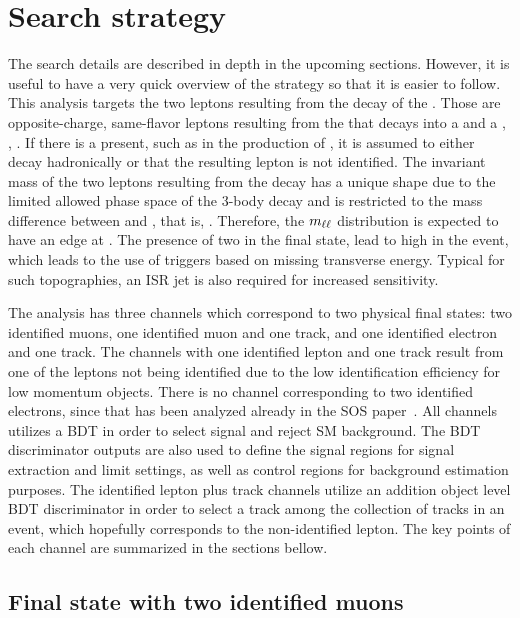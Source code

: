 \clearpage
\section{Search strategy}
\label{sec:search-strategy}

The search details are described in depth in the upcoming sections. However, it is useful to have a very quick overview of the strategy so that it is easier to follow. This analysis targets the two leptons resulting from the decay of the \neutt. Those are opposite-charge, same-flavor leptons \ellell resulting from the \neutt that decays into a \neuto and a \PZstar, \ie, \neuttdecay. If there is a \chargino present, such as in the production of \tchiwz, it is assumed to either decay hadronically or that the resulting lepton is not identified. The invariant mass of the two leptons resulting from the decay has a unique shape due to the limited allowed phase space of the 3-body decay and is restricted to the mass difference between \neutt and \neuto, that is, \dm. Therefore, the $m_{\ell\ell}$ distribution is expected to have an edge at \dm. The presence of two \neuto in the final state, lead to high \MET in the event, which leads to the use of triggers based on missing transverse energy. Typical for such topographies, an ISR jet is also required for increased sensitivity.

The analysis has three channels which correspond to two physical final states: two identified muons, one identified muon and one track, and one identified electron and one track. The channels with one identified lepton and one track result from one of the leptons not being identified due to the low identification efficiency for low momentum objects. There is no channel corresponding to two identified electrons, since that has been analyzed already in the SOS paper~\cite{sos}. All channels utilizes a BDT in order to select signal and reject SM background. The BDT discriminator outputs are also used to define the signal regions for signal extraction and limit settings, as well as control regions for background estimation purposes. The identified lepton plus track channels utilize an addition object level BDT discriminator in order to select a track among the collection of tracks in an event, which hopefully corresponds to the non-identified lepton. The key points of each channel are summarized in the sections bellow.


\subsection{Final state with two identified muons}
\label{sec:dimuon-category}

